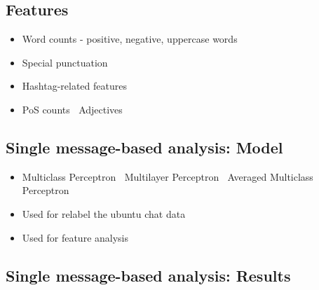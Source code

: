 \documentclass[
paper=128mm:96mm, %
fontsize=11pt, %
pagesize, %
parskip=half-, %
]{scrartcl} %
\newcommand{\red}[1]{\textit{\color{red}{#1}}}
\theoremstyle{mythmstyle} %
\begin{document}
\clearpage

\clearpage


\subsection*{Features}

\begin{itemize}
\item Word counts - positive, negative, uppercase words \red{REFERENCE}
\item Special punctuation
\item Hashtag-related features
\item PoS counts
\subitem \textbullet $\:$ Adjectives
\end{itemize}


\clearpage


\subsection*{Single message-based analysis: Model}


\begin{itemize}

\item Multiclass Perceptron
\subitem \textbullet $\:$ Multilayer Perceptron
\subitem \textbullet $\:$ Averaged Multiclass Perceptron

\item Used for relabel the ubuntu chat data
\item Used for feature analysis
\end{itemize}

\clearpage


\subsection*{Single message-based analysis: Results}
\end{document}
